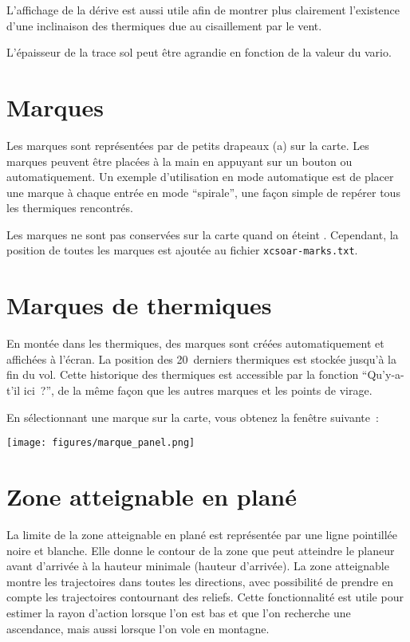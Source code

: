 L'affichage de la dérive est aussi utile afin de montrer plus clairement
l'existence d'une inclinaison des thermiques due au cisaillement par le vent.

L'épaisseur de la trace sol peut être agrandie en fonction de la valeur du vario.


\section{Marques}\label{sec:markers}

Les marques sont représentées par de petits drapeaux (a) sur la carte. Les marques peuvent être 
placées à la main en appuyant sur un bouton ou automatiquement. Un exemple d'utilisation
en mode automatique est de placer une marque à chaque entrée en mode ``spirale'', 
une façon simple de repérer tous les thermiques rencontrés.

Les marques ne sont pas conservées sur la carte quand on éteint \xc.
Cependant, la position de toutes les marques est ajoutée au fichier \verb|xcsoar-marks.txt|.

\section{Marques de thermiques}

En montée dans les thermiques, des marques sont créées automatiquement et
affichées à l'écran. La position des 20~derniers thermiques est
stockée jusqu'à la fin du vol. 
Cette historique des thermiques est accessible par la
fonction ``Qu'y-a-t'il ici~?'', de la même façon que les autres marques et les points de virage.

En sélectionnant une marque sur la carte, vous obtenez la fenêtre suivante~:
\begin{center}
\texttt{[image: figures/marque\_panel.png]}
\end{center}

\section{Zone atteignable en plané}\label{sec:reach}

La limite de la zone atteignable en plané est représentée par
une ligne pointillée noire et blanche. Elle donne le contour de la zone
que peut atteindre le planeur avant d’arrivée à la hauteur minimale (hauteur d'arrivée).
La zone atteignable montre les trajectoires dans toutes les directions, avec possibilité de prendre en compte les trajectoires contournant
des reliefs. Cette fonctionnalité est utile pour estimer la rayon d'action
lorsque l'on est bas et que l'on recherche une ascendance, mais aussi lorsque l'on vole
en montagne.

